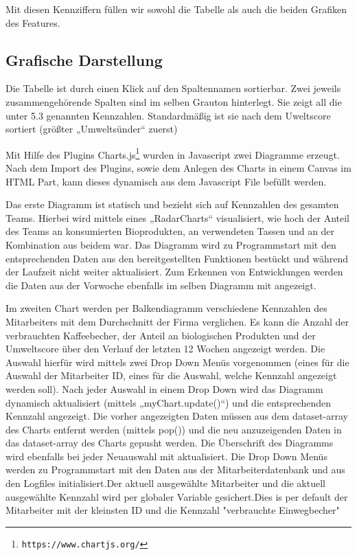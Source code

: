 \documentclass[a4paper,12pt,]{article}
\begin{document}
Mit diesen Kennziffern füllen wir sowohl die Tabelle als auch die beiden Grafiken des Features.


\subsection{Grafische Darstellung}
Die Tabelle ist durch einen Klick auf den Spaltennamen sortierbar. Zwei jeweils zusammengehörende Spalten sind im selben Grauton hinterlegt. Sie zeigt all die unter 5.3 genannten Kennzahlen. Standardmäßig ist sie nach dem Uweltscore sortiert (größter „Umweltsünder“ zuerst)

Mit Hilfe des Plugins Charts.js\footnote{\tt https://www.chartjs.org/} wurden in Javascript zwei Diagramme erzeugt.
Nach dem Import des Plugins, sowie dem Anlegen des Charts in einem Canvas im HTML Part, kann dieses dynamisch aus dem Javascript File befüllt werden.

Das erste Diagramm ist statisch und bezieht sich auf Kennzahlen des gesamten Teams. Hierbei wird mittels eines „RadarCharts“ visualisiert, wie hoch der Anteil des Teams an konsumierten Bioprodukten, an verwendeten Tassen und an der Kombination aus beidem war. Das Diagramm wird zu Programmstart mit den entsprechenden Daten aus den bereitgestellten Funktionen bestückt und während der Laufzeit nicht weiter aktualisiert. Zum Erkennen von Entwicklungen werden die Daten aus der Vorwoche ebenfalls im selben Diagramm mit angezeigt.

Im zweiten Chart werden per Balkendiagramm verschiedene Kennzahlen des Mitarbeiters mit dem Durchschnitt der Firma verglichen. Es kann die Anzahl der verbrauchten Kaffeebecher, der Anteil an biologischen Produkten und der Umweltscore über den Verlauf der letzten 12 Wochen angezeigt werden. Die Auswahl hierfür wird mittels zwei Drop Down Menüs vorgenommen (eines für die Auswahl der Mitarbeiter ID, eines für die Auswahl, welche Kennzahl angezeigt werden soll). Nach jeder Auswahl in einem Drop Down wird das Diagramm dynamisch aktualisiert (mittels „myChart.update()“) und die entsprechenden Kennzahl angezeigt.
Die vorher angezeigten Daten müssen aus dem dataset-array des Charts entfernt werden (mittels pop()) und die neu anzuzeigenden Daten in das dataset-array des Charts gepusht werden. Die Überschrift des Diagramms wird ebenfalls bei jeder Neuauswahl mit aktualisiert.
Die Drop Down Menüs werden zu Programmstart mit den Daten aus der Mitarbeiterdatenbank und aus den Logfiles initialisiert.Der aktuell ausgewählte Mitarbeiter und die aktuell ausgewählte Kennzahl wird per globaler Variable gesichert.Dies is per default der Mitarbeiter mit der kleinsten ID und die Kennzahl "verbrauchte Einwegbecher"
\end{document}
